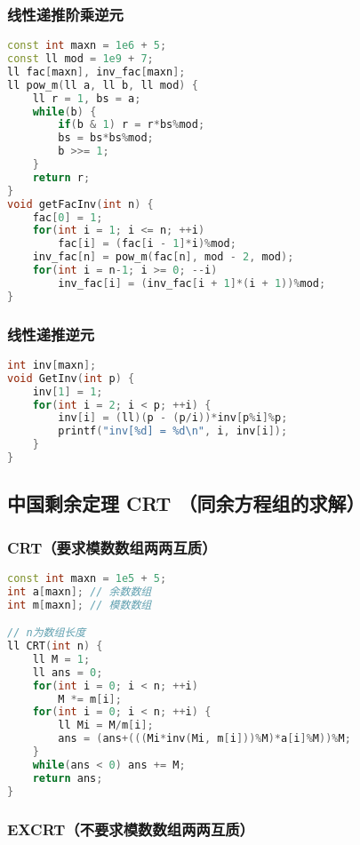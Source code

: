 \subsubsection{线性递推阶乘逆元}

\begin{lstlisting}[language=C++]
const int maxn = 1e6 + 5;
const ll mod = 1e9 + 7;
ll fac[maxn], inv_fac[maxn];
ll pow_m(ll a, ll b, ll mod) {
    ll r = 1, bs = a;
    while(b) {
        if(b & 1) r = r*bs%mod;
        bs = bs*bs%mod;
        b >>= 1;
    }
    return r;
}
void getFacInv(int n) {
    fac[0] = 1;
    for(int i = 1; i <= n; ++i)
        fac[i] = (fac[i - 1]*i)%mod;
    inv_fac[n] = pow_m(fac[n], mod - 2, mod);
    for(int i = n-1; i >= 0; --i)
        inv_fac[i] = (inv_fac[i + 1]*(i + 1))%mod;
}
\end{lstlisting}

\subsubsection{线性递推逆元}

\begin{lstlisting}[language=C++]
int inv[maxn];
void GetInv(int p) {
    inv[1] = 1;
    for(int i = 2; i < p; ++i) {
        inv[i] = (ll)(p - (p/i))*inv[p%i]%p;
        printf("inv[%d] = %d\n", i, inv[i]);
    }
}
\end{lstlisting}

\subsection{中国剩余定理 CRT （同余方程组的求解）}

\subsubsection{CRT（要求模数数组两两互质）}

\begin{lstlisting}[language=C++]
const int maxn = 1e5 + 5;
int a[maxn]; // 余数数组
int m[maxn]; // 模数数组

// n为数组长度
ll CRT(int n) {
    ll M = 1;
    ll ans = 0;
    for(int i = 0; i < n; ++i)
        M *= m[i];
    for(int i = 0; i < n; ++i) {
        ll Mi = M/m[i];
        ans = (ans+(((Mi*inv(Mi, m[i]))%M)*a[i]%M))%M;
    }
    while(ans < 0) ans += M;
    return ans;
}
\end{lstlisting}

\subsubsection{EXCRT（不要求模数数组两两互质）}

